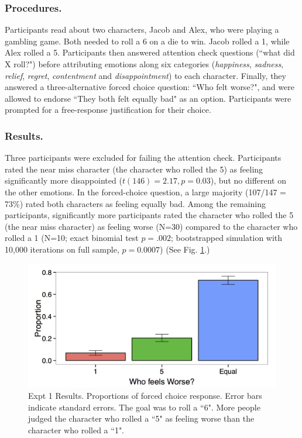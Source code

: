 \documentclass[10pt,letterpaper]{article}
\begin{document}
\subsubsection{Procedures.} Participants read about two characters, Jacob and Alex, who were playing a gambling game. Both needed to roll a 6 on a die to win. Jacob rolled a 1, while Alex rolled a 5. Participants then answered attention check questions (``what did X roll?") before attributing emotions along six categories (\textit{happiness}, \textit{sadness}, \textit{relief}, \textit{regret}, \textit{contentment} and \textit{disappointment})  to each character. Finally, they answered a three-alternative forced choice question: ``Who felt worse?", and were allowed to endorse ``They both felt equally bad" as an option. Participants were prompted for a free-response justification for their choice.

\subsubsection{Results.} Three participants were excluded for failing the attention check. Participants rated the near miss character (the character who rolled the 5) as feeling significantly more disappointed ($t(146)=2.17, p=0.03$), but no different on the other emotions. In the forced-choice question, a large majority (107/147 = 73\%) rated both characters as feeling equally bad. Among the remaining participants, significantly more participants rated the character who rolled the 5 (the near miss character) as feeling worse (N=30) compared to the character who rolled a 1 (N=10; exact binomial test $p=.002$; bootstrapped simulation with 10,000 iterations on full sample, $p=0.0007$) (See Fig. \ref{Expt1ResultFig}.)

\begin{figure}[htb!]
\includegraphics[width=\columnwidth]{images/Expt1results.png}
\caption{ Expt 1 Results. Proportions of forced choice response. Error bars indicate standard errors. The goal was to roll a ``6". More people judged the character who rolled a ``5" as feeling worse than the character who rolled a ``1".}
\label{Expt1ResultFig}
\end{figure}
\end{document}
